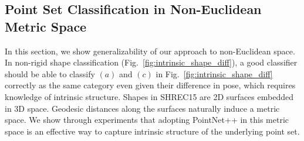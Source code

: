 

\vspace{-0.3cm}
\subsection{Point Set Classification in Non-Euclidean Metric Space}

In this section, we show generalizability of our approach to non-Euclidean space. In non-rigid shape classification (Fig.~\ref{fig:intrinsic_shape_diff}), a good classifier should be able to classify $(a)$ and $(c)$ in Fig.~\ref{fig:intrinsic_shape_diff} correctly as the same category even given their difference in pose, which requires knowledge of intrinsic structure.
Shapes in SHREC15 are 2D surfaces embedded in 3D space. Geodesic distances along the surfaces naturally induce a metric space. We show through experiments that adopting PointNet++ in this metric space is an effective way to capture intrinsic structure of the underlying point set.


